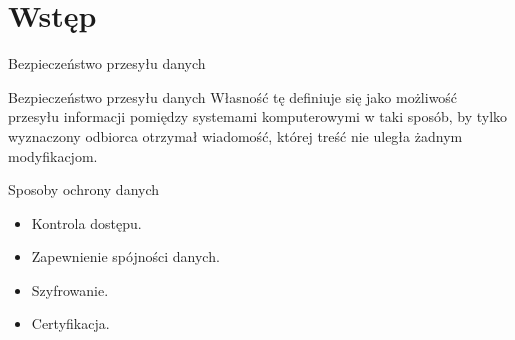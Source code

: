 \section{Wstęp}

\begin{frame}{Bezpieczeństwo przesyłu danych}
	\begin{alertblock}{Bezpieczeństwo przesyłu danych}
		Własność tę definiuje się jako możliwość przesyłu informacji pomiędzy systemami komputerowymi w taki sposób, by tylko wyznaczony odbiorca otrzymał wiadomość, której treść nie uległa żadnym modyfikacjom. 	
	\end{alertblock}
\end{frame}

\begin{frame}{Sposoby ochrony danych}
	\begin{itemize}
		\item Kontrola dostępu.
		\item Zapewnienie spójności danych.
		\item Szyfrowanie.
		\item Certyfikacja.
		
	\end{itemize} 
\end{frame}